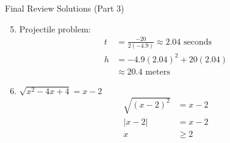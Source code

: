 \documentclass[aspectratio=169]{beamer}
\begin{document}
\begin{frame}{Final Review Solutions (Part 3)}
    \begin{tcolorbox}[colback=lightgray,colframe=accent,title=Detailed Solutions (Continued)]
        \footnotesize
        \begin{enumerate}
            \setcounter{enumi}{4}
            \item Projectile problem:
            \begin{align*}
                t &= \frac{-20}{2(-4.9)} \approx 2.04 \text{ seconds} \\
                h &= -4.9(2.04)^2 + 20(2.04) \\
                &\approx 20.4 \text{ meters}
            \end{align*}
            
            \item $\sqrt{x^2 - 4x + 4} = x - 2$
            \begin{align*}
                \sqrt{(x-2)^2} &= x - 2 \\
                |x-2| &= x - 2 \\
                x &\geq 2
            \end{align*}
        \end{enumerate}
    \end{tcolorbox}
\end{frame}
\end{document}
